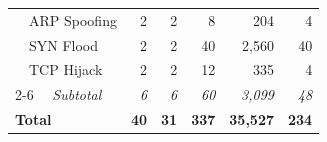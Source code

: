 \begin{table}[t]
\begin{tabular}{@{}l r r r r r@{}}
    ~~ARP Spoofing         & 2 & 2 &  8 &   204 &  4 \\
    ~~SYN Flood            & 2 & 2 & 40 & 2,560 & 40 \\
    ~~TCP Hijack           & 2 & 2 & 12 &   335 &  4 \\
    \cmidrule(l){2-6}
    ~~\textit{Subtotal}    & \textit{6} & \textit{6} & \textit{60} & \textit{3,099} & \textit{48} \\
    \midrule
    \textbf{Total}         & \textbf{40} & \textbf{31} & \textbf{337} & \textbf{35,527} & \textbf{234} \\
    \bottomrule
  \end{tabular}
\end{table}
